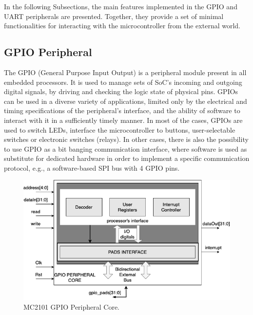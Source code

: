 In the following Subsections, the main features implemented in the GPIO and UART peripherals are presented. Together, they provide a set of minimal functionalities for interacting with the microcontroller from the external world.

\subsection{GPIO Peripheral}
The GPIO (General Purpose Input Output) is a peripheral module present in all embedded processors. It is used to manage sets of SoC's incoming and outgoing digital signals, by driving and checking the logic state of physical pins. GPIOs can be used in a diverse variety of applications, limited only by the electrical and timing specifications of the peripheral's interface, and the ability of software to interact with it in a sufficiently timely manner. In most of the cases, GPIOs are used to switch LEDs, interface the microcontroller to buttons, user-selectable switches or electronic switches (relays). In other cases, there is also the possibility to use GPIO as a bit banging communication interface, where software is used as substitute for dedicated hardware in order to implement a specific communication protocol, e.g., a software-based SPI bus with 4 GPIO pins.

\begin{figure}[h]
\vspace{0.5cm}
\includegraphics[width=\textwidth]{./images/GPIO}
\caption{MC2101 GPIO Peripheral Core.}
\label{fig:gpio} %
\end{figure}

